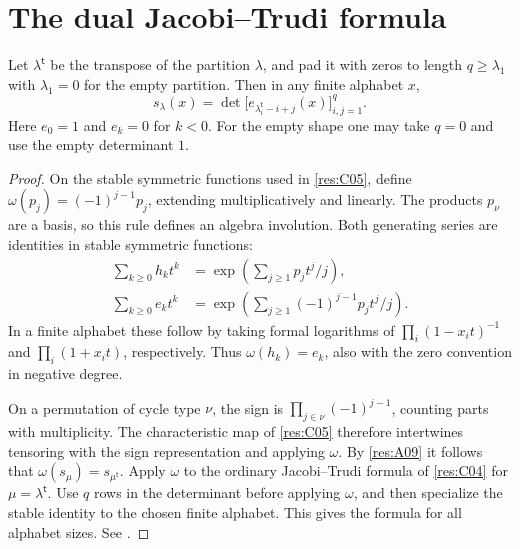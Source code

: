 \section{The dual Jacobi--Trudi formula}

\begin{corollary}\label{res:C09}
Let \(\lambda^{\mathsf t}\) be the transpose of the partition
\(\lambda\), and pad it with zeros to length \(q\ge \lambda_1\)
with \(\lambda_1=0\) for the empty partition.
Then in any finite alphabet \(x\),
\[
 s_\lambda(x)=
 \det\bigl[e_{\lambda^{\mathsf t}_i-i+j}(x)\bigr]_{i,j=1}^{q}.
\]
Here \(e_0=1\) and \(e_k=0\) for \(k<0\). For the empty shape one
may take \(q=0\) and use the empty determinant \(1\).
\end{corollary}

\begin{proof}
On the stable symmetric functions used in \ref{res:C05}, define
\(\omega(p_j)=(-1)^{j-1}p_j\), extending multiplicatively and
linearly. The products \(p_\nu\) are a basis, so this rule defines
an algebra involution. Both generating series are identities
in stable symmetric functions:
\begin{align*}
 \sum_{k\ge0}h_k t^k &= \exp\!\left(\sum_{j\ge1}p_jt^j/j\right),\\
 \sum_{k\ge0}e_k t^k &= \exp\!\left(\sum_{j\ge1}(-1)^{j-1}p_jt^j/j\right).
\end{align*}
In a finite alphabet these follow by taking formal logarithms of
\(\prod_i(1-x_it)^{-1}\) and \(\prod_i(1+x_it)\), respectively.
Thus \(\omega(h_k)=e_k\), also with the zero convention in
negative degree.

On a permutation of cycle type \(\nu\), the sign is
\(\prod_{j\in\nu}(-1)^{j-1}\), counting parts with multiplicity.
The characteristic map of \ref{res:C05} therefore intertwines
tensoring with the sign representation and applying \(\omega\).
By \ref{res:A09} it follows that
\(\omega(s_\mu)=s_{\mu^{\mathsf t}}\). Apply \(\omega\) to the
ordinary Jacobi--Trudi formula of \ref{res:C04} for
\(\mu=\lambda^{\mathsf t}\). Use \(q\) rows in the determinant
before applying \(\omega\), and then specialize the stable
identity to the chosen finite alphabet. This gives the formula
for all alphabet sizes. See \cite[Theorem 4.5.1]{sagan}.
\end{proof}
